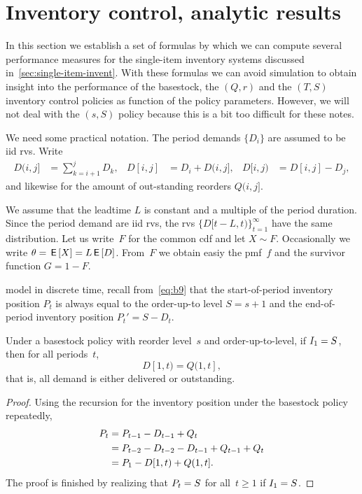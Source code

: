 \documentclass[stochastic-or.tex]{subfiles}
\begin{document}
\section{Inventory control, analytic results}
\label{sec:invent-contr-analyt}

In this section we establish a set of formulas by which we can compute several performance measures for the single-item inventory systems discussed in~\cref{sec:single-item-invent}.
With these formulas we can avoid simulation to obtain insight into the performance of the basestock, the $(Q,r)$ and the $(T,S)$ inventory control policies as function of the policy parameters. However,
we will not deal with the $(s,S)$ policy because this is a bit too difficult for these notes.

We need some practical notation.
The period demands $\{D_{i}\}$ are assumed to be iid rvs.
Write
\begin{align*}
  D(i, j] &= \sum_{k=i+1}^{j} D_k, &   D[i, j] &= D_{i} + D(i, j],  &   D[i, j) &= D[i, j] - D_{j},
\end{align*}
and likewise for the amount of out-standing reorders $Q(i, j]$.


We assume that the leadtime $L$ is constant and a multiple of the period duration.
Since the period demand are iid rvs, the rvs $\{D[t-L, t)\}_{t=1}^{\infty}$ have the same distribution.
Let us write~$F$ for the common cdf and let $X\sim F$.
Occasionally we write $\theta = \,\mathsf{E}\left[X\right] = L \,\mathsf{E}\left[D\right]$.
From~$F$ we obtain easiy the pmf~$f$ and the survivor function $G=1-F$.


 model in discrete time, recall from~\cref{eq:b9} that the start-of-period inventory position $P_{t}$ is always equal to the order-up-to level $S=s+1$ and the end-of-period inventory position $P_t' = S - D_{t}$.


\begin{lemma}\label{lem:1}
Under a basestock policy with reorder level~$s$ and order-up-to-level, if $I_{1} = S$, then for all periods~$t$,
\begin{equation*}
    D[1, t) = Q(1, t],
\end{equation*}
that is, all demand is either delivered or outstanding.
\end{lemma}
\begin{proof}
Using the recursion for the inventory position under the basestock policy repeatedly,
\begin{align*}
    P_t
&= P_{t-1} -D_{t-1}+ Q_t  \\
&= P_{t-2} -D_{t-2} - D_{t-1}+  Q_{t-1}+ Q_t  \\
&= P_1 - D[1, t) +     Q(1, t].
\end{align*}
The proof is finished by realizing that $P_{t} = S$ for all~$t\geq 1$ if $I_1=S$.
\end{proof}
\end{document}
